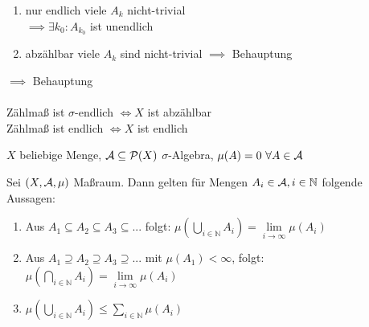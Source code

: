 \documentclass[11pt,a4paper,fleqn,openany]{report}
\begin{document}
\begin{example}
\begin{enumerate}
              \begin{enumerate}
                \item nur endlich viele $A_k$ nicht-trivial\\
                      $\implies \exists k_0: A_{k_0}$ ist unendlich
                \item abzählbar viele $A_k$ sind nicht-trivial $\implies$ Behauptung
              \end{enumerate}
              $\implies$ Behauptung\\
              \\
              Zählmaß ist $\sigma$-endlich $\Leftrightarrow X$ ist abzählbar\\
              Zählmaß ist endlich $\Leftrightarrow X$ ist endlich
      \end{enumerate}
    \end{example}

    \begin{example}
      $X$ beliebige Menge, $\mathcal{A} \subseteq \mathcal{P}(X)$ $\sigma$-Algebra, $\mu(A)=0 \ \forall A \in \mathcal{A}$
    \end{example}

    \begin{theorem}
      Sei $(X,\mathcal{A},\mu)$ Maßraum. Dann gelten für Mengen $A_i \in \mathcal{A}, i \in \mathbb{N}$ folgende Aussagen:

      \begin{enumerate}[label=(\roman*)]
        \item Aus $A_1 \subseteq A_2 \subseteq A_3 \subseteq ...$ folgt: $\mu (\bigcup\limits_{i \in \mathbb{N}} A_i) = \lim\limits_{i \to \infty} \mu (A_i)$
        \item Aus $A_1 \supseteq A_2 \supseteq A_3 \supseteq ...$ mit $\mu(A_1)<\infty$, folgt: $\mu (\bigcap\limits_{i \in \mathbb{N}} A_i) = \lim\limits_{i\to \infty} \mu (A_i)$
        \item $\mu(\bigcup\limits_{i\in \mathbb{N}} A_i) \leq \sum\limits_{i\in \mathbb{N}} \mu(A_i)$
      \end{enumerate}
    \end{theorem}
\end{document}
